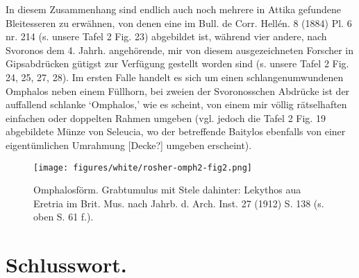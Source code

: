 \documentclass[a4paper, 11pt, oneside]{article}
\begin{document}
In diesem Zusammenhang sind endlich auch noch mehrere in Attika gefundene Bleitesseren zu erwähnen, von denen eine im Bull. de Corr. Hellén. 8 (1884) Pl. 6 nr. 214 (s. unsere Tafel 2 Fig. 23) abgebildet ist, während vier andere, nach Svoronos dem 4. Jahrh. angehörende, mir von diesem ausgezeichneten Forscher in Gipsabdrücken gütigst zur Verfügung gestellt worden sind (s. unsere Tafel 2 Fig. 24, 25, 27, 28). Im ersten Falle handelt es sich um einen schlangenumwundenen Omphalos neben einem Füllhorn, bei zweien der Svoronosschen Abdrücke ist der auffallend schlanke `Omphalos,' wie es scheint, von einem mir völlig rätselhaften einfachen oder doppelten Rahmen umgeben (vgl. jedoch die Tafel 2 Fig. 19 abgebildete Münze von Seleucia, wo der betreffende Baitylos ebenfalls von einer eigentümlichen Umrahmung [Decke?] umgeben erscheint).
\begin{figure}[H]
\centering
\texttt{[image: figures/white/rosher-omph2-fig2.png]}
\caption{Omphalosförm. Grabtumulus mit Stele dahinter: Lekythos aua Eretria im Brit. Mus. nach Jahrb. d. Arch. Inst. 27 (1912) S. 138 (s. oben S. 61 f.).}
\end{figure}
\clearpage
\section{Schlusswort.}
\end{document}

